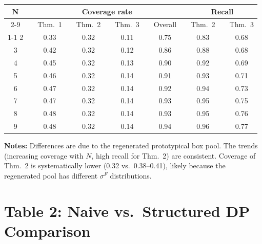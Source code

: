 \documentclass[11pt]{article}
\newcommand{\paperlabel}{\medskip{\large\bfseries\color{red!70!black} Original (Paper)}\par\medskip}
\newcommand{\noteslabel}[1]{\bigskip\noindent\textbf{Notes:} #1}
\begin{document}
\begin{table}[H]
\centering
\small
\begin{tabular}{ccccccccccccc}
\toprule
\multirow{2}[4]{*}{N} & & \multicolumn{7}{c}{Coverage rate} & & \multicolumn{3}{c}{Recall} \\
\cmidrule{2-9}\cmidrule{11-13}
  & & Thm.~1 & & Thm.~2 & & Thm.~3 & & Overall & & Thm.~2 & & Thm.~3 \\
\cmidrule{1-1}\cmidrule{3-3}\cmidrule{5-5}\cmidrule{7-7}\cmidrule{9-9}\cmidrule{11-11}\cmidrule{13-13}
2  & & 0.33 & & 0.32 & & 0.11 & & 0.75 & & 0.83 & & 0.68 \\
3  & & 0.42 & & 0.32 & & 0.12 & & 0.86 & & 0.88 & & 0.68 \\
4  & & 0.45 & & 0.32 & & 0.13 & & 0.90 & & 0.92 & & 0.69 \\
5  & & 0.46 & & 0.32 & & 0.14 & & 0.91 & & 0.93 & & 0.71 \\
6  & & 0.47 & & 0.32 & & 0.14 & & 0.92 & & 0.94 & & 0.73 \\
7  & & 0.47 & & 0.32 & & 0.14 & & 0.93 & & 0.95 & & 0.75 \\
8  & & 0.48 & & 0.32 & & 0.14 & & 0.93 & & 0.95 & & 0.76 \\
9  & & 0.48 & & 0.32 & & 0.14 & & 0.94 & & 0.96 & & 0.77 \\
\bottomrule
\end{tabular}
\end{table}

\noteslabel{Differences are due to the regenerated prototypical box pool.
The trends (increasing coverage with $N$, high recall for Thm.~2) are consistent.
Coverage of Thm.~2 is systematically lower (0.32 vs.\ 0.38--0.41), likely because the
regenerated pool has different $\sigma^F$ distributions.}

\newpage
\section{Table 2: Naive vs.\ Structured DP Comparison}

\paperlabel
\end{document}
